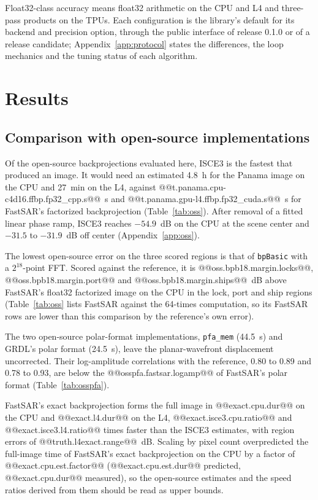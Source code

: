 \documentclass[11pt]{article}
\begin{document}
Float32-class accuracy means float32 arithmetic on the CPU and L4 and three-pass products on the TPUs. Each configuration is the library's default for its backend and precision option, through the public interface of release 0.1.0 or of a release candidate; Appendix~\ref{app:protocol} states the differences, the loop mechanics and the tuning status of each algorithm.

\section{Results}
\label{sec:results}

\subsection{Comparison with open-source implementations}
\label{sec:oss}

Of the open-source backprojections evaluated here, ISCE3 is the fastest that produced an image. It would need an estimated 4.8~h for the Panama image on the CPU and 27~min on the L4, against @@t.panama.cpu-c4d16.ffbp.fp32_cpp.s@@~s and @@t.panama.gpu-l4.ffbp.fp32_cuda.s@@~s for FastSAR's factorized backprojection (Table~\ref{tab:oss}). After removal of a fitted linear phase ramp, ISCE3 reaches $-54.9$~dB on the CPU at the scene center and $-31.5$ to $-31.9$~dB off center (Appendix~\ref{app:oss}). 

The lowest open-source error on the three scored regions is that of \texttt{bpBasic} with a $2^{18}$-point FFT. Scored against the reference, it is @@oss.bpb18.margin.locks@@, @@oss.bpb18.margin.port@@ and @@oss.bpb18.margin.ships@@~dB above FastSAR's float32 factorized image on the CPU in the lock, port and ship regions (Table~\ref{tab:oss} lists FastSAR against the 64-times computation, so its FastSAR rows are lower than this comparison by the reference's own error).



The two open-source polar-format implementations, \texttt{pfa\_mem} (44.5~s) and GRDL's polar format (24.5~s), leave the planar-wavefront displacement uncorrected. Their log-amplitude correlations with the reference, 0.80 to 0.89 and 0.78 to 0.93, are below the @@osspfa.fastsar.logamp@@ of FastSAR's polar format (Table~\ref{tab:osspfa}).

FastSAR's exact backprojection forms the full image in @@exact.cpu.dur@@ on the CPU and @@exact.l4.dur@@ on the L4, @@exact.isce3.cpu.ratio@@ and @@exact.isce3.l4.ratio@@ times faster than the ISCE3 estimates, with region errors of @@truth.l4exact.range@@~dB. Scaling by pixel count overpredicted the full-image time of FastSAR's exact backprojection on the CPU by a factor of @@exact.cpu.est.factor@@ (@@exact.cpu.est.dur@@ predicted, @@exact.cpu.dur@@ measured), so the open-source estimates and the speed ratios derived from them should be read as upper bounds.
\end{document}
